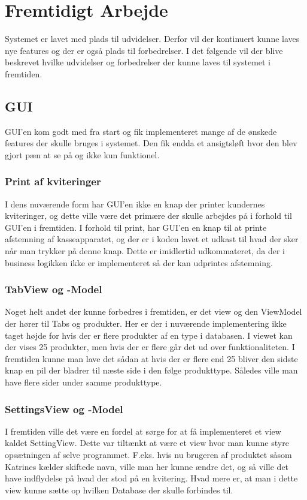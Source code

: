 \section{Fremtidigt Arbejde}
Systemet er lavet med plads til udvidelser. Derfor vil der kontinuert kunne laves nye features og der er også plads til forbedrelser. I det følgende vil der blive beskrevet hvilke udvidelser og forbedrelser der kunne laves til systemet i fremtiden. 

\subsection{GUI}
GUI'en kom godt med fra start og fik implementeret mange af de ønskede features der skulle bruges i systemet. Den fik endda et ansigtsløft hvor den blev gjort pæn at se på og ikke kun funktionel.\newline 
\subsubsection{Print af kviteringer}
I dens nuværende form har GUI'en ikke en knap der printer kundernes kviteringer, og dette ville være det primære der skulle arbejdes på i forhold til GUI'en i fremtiden. I forhold til print, har GUI'en en knap til at printe afstemning af kasseapparatet, og der er i koden lavet et udkast til hvad der sker når man trykker på denne knap. Dette er imidlertid udkommateret, da der i business logikken ikke er implementeret så der kan udprintes afstemning.\newline
\subsubsection{TabView og -Model}
Noget helt andet der kunne forbedres i fremtiden, er det view og den ViewModel der hører til Tabs og produkter. Her er der i nuværende implementering ikke taget højde for hvis der er flere produkter af en type i databasen. I viewet kan der vises 25 produkter, men hvis der er flere går det ud over funktionaliteten. I fremtiden kunne man lave det sådan at hvis der er flere end 25 bliver den sidste knap en pil der bladrer til næste side i den følge produkttype. Således ville man have flere sider under samme produkttype.\newline
\subsubsection{SettingsView og -Model}
I fremtiden ville det være en fordel at sørge for at få implementeret et view kaldet SettingView. Dette var tiltænkt at være et view hvor man kunne styre opsætningen af selve programmet. F.eks. hvis nu brugeren af produktet såsom Katrines kælder skiftede navn, ville man her kunne ændre det, og så ville det have indflydelse på hvad der stod på en kvitering. Hvad mere er, at man i dette view kunne sætte op hvilken Database der skulle forbindes til. 

